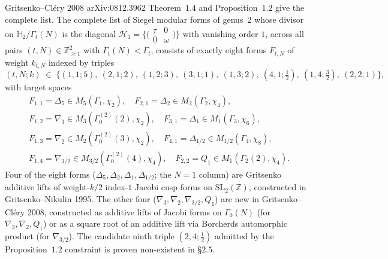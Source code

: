 \begin{theorem}
\label{thm:gritsenko-clery-eight-forms}
Gritsenko--Cl\'ery 2008 arXiv:0812.3962 Theorem~$1.4$ and
Proposition~$1.2$ give the complete list.
The complete list of Siegel modular forms of genus~$2$ whose
divisor on $\mathbb{H}_2 / \Gamma_t(N)$ is the diagonal
$\mathcal{H}_1 = \{\bigl(\begin{smallmatrix} \tau & 0 \\ 0 & \omega
\end{smallmatrix}\bigr)\}$ with vanishing order $1$, across all pairs
$(t, N) \in \mathbb{Z}_{\geq 1}^2$ with $\Gamma_t(N) < \Gamma_t$, consists
of exactly eight forms $F_{t, N}$ of weight $k_{t, N}$ indexed by triples
\[
 (t, N; k) \;\in\; \bigl\{
 (1,1;5),\ (2,1;2),\ (1,2;3),\ (3,1;1),\ (1,3;2),\
 (4,1;\tfrac{1}{2}),\ (1,4;\tfrac{3}{2}),\ (2,2;1)
 \bigr\},
\]
with target spaces
\[
\begin{aligned}
 &F_{1,1} = \Delta_5 \in M_5(\Gamma_1, \chi_2),\quad
 F_{2,1} = \Delta_2 \in M_2(\Gamma_2, \chi_4), \\
 &F_{1,2} = \nabla_3 \in M_3(\Gamma_0^{(2)}(2), \chi_2),\quad
 F_{3,1} = \Delta_1 \in M_1(\Gamma_3, \chi_6), \\
 &F_{1,3} = \nabla_2 \in M_2(\Gamma_0^{(2)}(3), \chi_2),\quad
 F_{4,1} = \Delta_{1/2} \in M_{1/2}(\Gamma_4, \chi_8), \\
 &F_{1,4} = \nabla_{3/2} \in M_{3/2}(\Gamma_0^{(2)}(4), \chi_4),\quad
 F_{2,2} = Q_1 \in M_1(\Gamma_2(2), \chi_4).
\end{aligned}
\]
Four of the eight forms ($\Delta_5, \Delta_2, \Delta_1, \Delta_{1/2}$;
the $N = 1$ column) are Gritsenko additive lifts of weight-$k/2$
index-$1$ Jacobi cusp forms on $\mathrm{SL}_2(\mathbb{Z})$, constructed
in Gritsenko--Nikulin 1995. The other four ($\nabla_3, \nabla_2,
\nabla_{3/2}, Q_1$) are new in Gritsenko--Cl\'ery 2008, constructed as
additive lifts of Jacobi forms on $\Gamma_0(N)$ (for $\nabla_3, \nabla_2,
Q_1$) or as a square root of an additive lift via Borcherds automorphic
product (for $\nabla_{3/2}$). The candidate ninth triple $(2, 4; \tfrac12)$
admitted by the Proposition~$1.2$ constraint is proven non-existent in
\S$2.5$.
\end{theorem}

